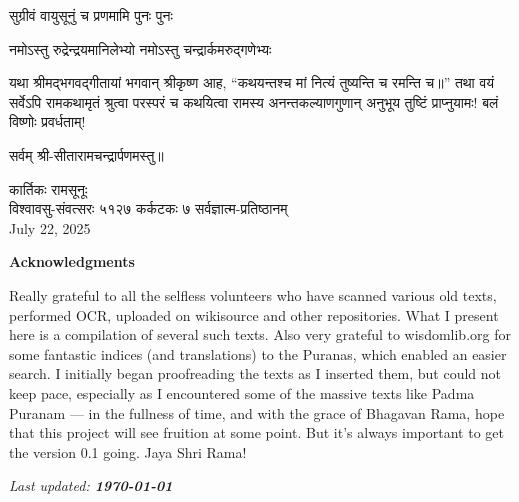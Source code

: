 {सुग्रीवं वायुसूनुं च प्रणमामि पुनः पुनः}

{नमोऽस्तु रुद्रेन्द्रयमानिलेभ्यो नमोऽस्तु चन्द्रार्कमरुद्गणेभ्यः}

यथा श्रीमद्भगवद्\-गीतायां भगवान् श्रीकृष्ण आह, ``कथयन्तश्च मां नित्यं तुष्यन्ति च रमन्ति च॥'' तथा वयं सर्वेऽपि रामकथामृतं श्रुत्वा परस्परं च कथयित्वा रामस्य अनन्तकल्याणगुणान् अनुभूय तुष्टिं प्राप्नुयामः! बलं विष्णोः प्रवर्धताम्!\\



\centerline{सर्वम् श्री-सीतारामचन्द्रार्पणमस्तु॥}
\endgroup
\medskip
{} \hfill कार्तिकः रामसूनूः\\
विश्वावसु-संवत्सरः ५१२७ कर्कटकः ७ \hfill सर्वज्ञात्म-प्रतिष्ठानम्\\
July 22, 2025


\vfill

\centerline{\large \textbf{Acknowledgments}}

\textsf{\scriptsize Really grateful to all the selfless volunteers who have scanned various old texts, performed OCR, uploaded on wikisource and other repositories. What I present here is a compilation of several such texts. Also very grateful to wisdomlib.org for some fantastic indices (and translations) to the Puranas, which enabled an easier search. %
 I initially began proofreading the texts as I inserted them, but could not keep pace, especially as I encountered some of the massive texts like Padma Puranam --- in the fullness of time, and with the grace of Bhagavan Rama, hope that this project will see fruition at some point. But it's always important to get the version 0.1 going. Jaya Shri Rama!}

\bigskip

\centerline{\textit{\scriptsize Last updated: \textbf{\today}}}